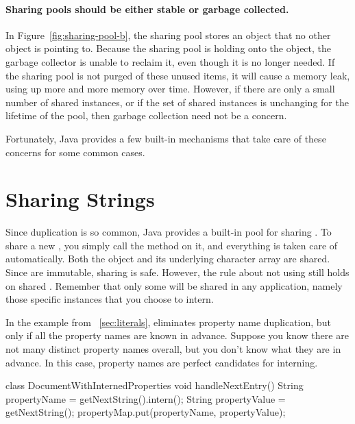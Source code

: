 \paragraph{Sharing pools should be either stable or garbage collected.} 
In Figure~\ref{fig:sharing-pool-b}, the sharing pool stores an object
that no other object is pointing to. Because the sharing pool is holding
onto the object, the garbage
collector is unable to reclaim it, even though it is no longer needed.  
If the sharing pool is not purged of these unused items, it will
cause a memory leak, using up more and more memory over time. However, if there
are only a small number of shared instances, or if the set of shared
instances is unchanging for the lifetime of the pool, then garbage collection need not be a concern.

Fortunately, Java provides a few built-in mechanisms that take care of
these concerns for some common cases.

\section{Sharing Strings}
\label{sec:sharing-strings}

Since  duplication is so common, Java provides a built-in
pool for sharing . To share a new
, you simply call the method  on it, and 
everything is taken care of automatically. Both the 
object and its underlying character array are shared. Since
 are immutable, sharing is safe.
However, the rule about not using \code{==} still holds on shared
.  Remember that only some
 will be shared in any application, namely those specific
instances that you choose to intern.

In the example from ~\autoref{sec:literals},
 eliminates property
name duplication, but only if all the property names are known in advance.
Suppose you know there are not many distinct property names overall, but you
don't know what they are in advance. In this case, property names
are perfect candidates for  interning.
\begin{shortlisting}
 
 class DocumentWithInternedProperties {
    void handleNextEntry() {
       String propertyName = getNextString().intern(); 
       String propertyValue = getNextString();
       propertyMap.put(propertyName, propertyValue);
    }
}
\end{shortlisting}

